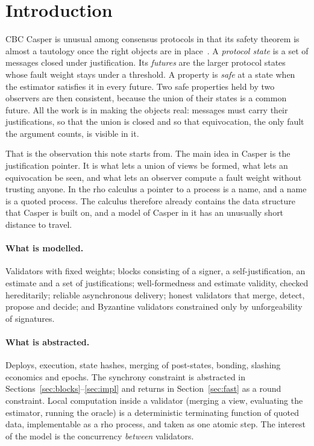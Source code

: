 \documentclass[11pt]{article}
\theoremstyle{definition}
\theoremstyle{remark}
\begin{document}
\tableofcontents

\section{Introduction}

CBC Casper is unusual among consensus protocols in that its safety theorem is
almost a tautology once the right objects are in place~\cite{cbc,tfg}. A
\emph{protocol state} is a set of messages closed under justification. Its
\emph{futures} are the larger protocol states whose fault weight stays under a
threshold. A property is \emph{safe} at a state when the estimator satisfies it
in every future. Two safe properties held by two observers are then
consistent, because the union of their states is a common future. All the work
is in making the objects real: messages must carry their justifications, so
that the union is closed and so that equivocation, the only fault the argument
counts, is visible in it.

That is the observation this note starts from. The main idea in Casper is the
justification pointer. It is what lets a union of views be formed, what lets an
equivocation be seen, and what lets an observer compute a fault weight without
trusting anyone. In the rho calculus a pointer to a process is a name, and a
name is a quoted process. The calculus therefore already contains the data
structure that Casper is built on, and a model of Casper in it has an unusually
short distance to travel.

\paragraph{What is modelled.}
Validators with fixed weights; blocks consisting of a signer, a
self-justification, an estimate and a set of justifications; well-formedness
and estimate validity, checked hereditarily; reliable asynchronous delivery;
honest validators that merge, detect, propose and decide; and Byzantine
validators constrained only by unforgeability of signatures.

\paragraph{What is abstracted.}
Deploys, execution, state hashes, merging of post-states, bonding, slashing
economics and epochs. The synchrony constraint is abstracted in
Sections~\ref{sec:blocks}--\ref{sec:impl} and returns in
Section~\ref{sec:fast} as a round constraint. Local computation inside a
validator (merging a view, evaluating the estimator, running the oracle) is a
deterministic terminating function of quoted data, implementable as a rho
process, and taken as one atomic step. The interest of the model is the
concurrency \emph{between} validators.
\end{document}
